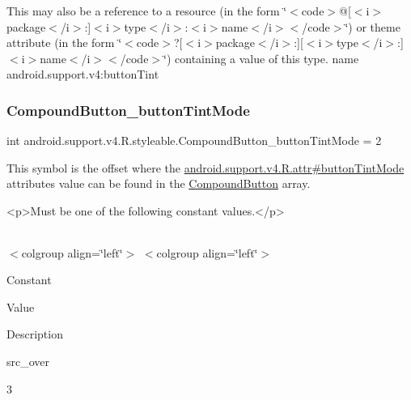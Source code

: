This may also be a reference to a resource (in the form \char`\"{}$<$code$>$@\mbox{[}$<$i$>$package$<$/i$>$\+:\mbox{]}$<$i$>$type$<$/i$>$\+:$<$i$>$name$<$/i$>$$<$/code$>$\char`\"{}) or theme attribute (in the form \char`\"{}$<$code$>$?\mbox{[}$<$i$>$package$<$/i$>$\+:\mbox{]}\mbox{[}$<$i$>$type$<$/i$>$\+:\mbox{]}$<$i$>$name$<$/i$>$$<$/code$>$\char`\"{}) containing a value of this type.  name android.\+support.\+v4\+:button\+Tint \mbox{\label{classandroid_1_1support_1_1v4_1_1R_1_1styleable_a93b165b3f35bb81a7874aa1c16cdd3c9}} 
\subsubsection{\texorpdfstring{Compound\+Button\+\_\+button\+Tint\+Mode}{CompoundButton\_buttonTintMode}}
{\footnotesize\ttfamily int android.\+support.\+v4.\+R.\+styleable.\+Compound\+Button\+\_\+button\+Tint\+Mode = 2\hspace{0.3cm}{\ttfamily [static]}}

This symbol is the offset where the \hyperlink{classandroid_1_1support_1_1v4_1_1R_1_1attr_a7ad1fc4f5ce03f5edd37110e460fdf1c}{android.\+support.\+v4.\+R.\+attr\#button\+Tint\+Mode} attribute\textquotesingle{}s value can be found in the \hyperlink{classandroid_1_1support_1_1v4_1_1R_1_1styleable_ab9cf77e48999c324e11a9b63f5429cfd}{Compound\+Button} array.

\begin{DoxyVerb}      <p>Must be one of the following constant values.</p>
\end{DoxyVerb}
 \tabulinesep=1mm
\begin{longtabu} spread 0pt [c]{*{0}{|X[-1]}|}
\hline
\end{longtabu}
$<$colgroup align=\char`\"{}left\char`\"{}$>$ $<$colgroup align=\char`\"{}left\char`\"{}$>$ 

Constant

Value

Description 

{\ttfamily src\+\_\+over}

3

